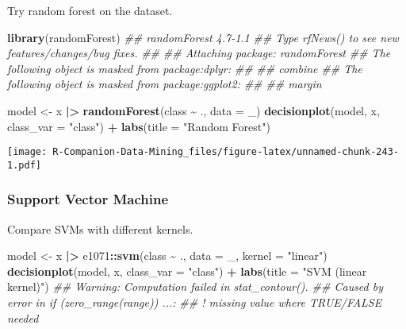 \documentclass[
  notitlepage]{book}
\newenvironment{Shaded}{\begin{snugshade}}{\end{snugshade}}
\newcommand{\CommentTok}[1]{\textcolor[rgb]{0.56,0.35,0.01}{\textit{#1}}}
\newcommand{\DataTypeTok}[1]{\textcolor[rgb]{0.13,0.29,0.53}{#1}}
\newcommand{\ErrorTok}[1]{\textcolor[rgb]{0.64,0.00,0.00}{\textbf{#1}}}
\newcommand{\KeywordTok}[1]{\textcolor[rgb]{0.13,0.29,0.53}{\textbf{#1}}}
\newcommand{\NormalTok}[1]{#1}
\newcommand{\OperatorTok}[1]{\textcolor[rgb]{0.81,0.36,0.00}{\textbf{#1}}}
\newcommand{\StringTok}[1]{\textcolor[rgb]{0.31,0.60,0.02}{#1}}
\begin{document}
Try random forest on the dataset.

\begin{Shaded}
\begin{Highlighting}[]
\KeywordTok{library}\NormalTok{(randomForest)}
\CommentTok{\#\# randomForest 4.7{-}1.1}
\CommentTok{\#\# Type rfNews() to see new features/changes/bug fixes.}
\CommentTok{\#\# }
\CommentTok{\#\# Attaching package: \textquotesingle{}randomForest\textquotesingle{}}
\CommentTok{\#\# The following object is masked from \textquotesingle{}package:dplyr\textquotesingle{}:}
\CommentTok{\#\# }
\CommentTok{\#\#     combine}
\CommentTok{\#\# The following object is masked from \textquotesingle{}package:ggplot2\textquotesingle{}:}
\CommentTok{\#\# }
\CommentTok{\#\#     margin}
\end{Highlighting}
\end{Shaded}

\begin{Shaded}
\begin{Highlighting}[]
\NormalTok{model \textless{}{-}}\StringTok{ }\NormalTok{x }\OperatorTok{|}\ErrorTok{\textgreater{}}\StringTok{ }\KeywordTok{randomForest}\NormalTok{(class }\OperatorTok{\textasciitilde{}}\StringTok{ }\NormalTok{., }\DataTypeTok{data =}\NormalTok{ \_)}
\KeywordTok{decisionplot}\NormalTok{(model, x, }\DataTypeTok{class\_var =} \StringTok{"class"}\NormalTok{) }\OperatorTok{+}\StringTok{ }
\StringTok{  }\KeywordTok{labs}\NormalTok{(}\DataTypeTok{title =} \StringTok{"Random Forest"}\NormalTok{)}
\end{Highlighting}
\end{Shaded}

\texttt{[image: R-Companion-Data-Mining\_files/figure-latex/unnamed-chunk-243-1.pdf]}

\hypertarget{support-vector-machine-1}{%
\subsubsection{Support Vector Machine}\label{support-vector-machine-1}}

Compare SVMs with different kernels.

\begin{Shaded}
\begin{Highlighting}[]
\NormalTok{model \textless{}{-}}\StringTok{ }\NormalTok{x }\OperatorTok{|}\ErrorTok{\textgreater{}}\StringTok{ }\NormalTok{e1071}\OperatorTok{::}\KeywordTok{svm}\NormalTok{(class }\OperatorTok{\textasciitilde{}}\StringTok{ }\NormalTok{., }\DataTypeTok{data =}\NormalTok{ \_, }
                         \DataTypeTok{kernel =} \StringTok{"linear"}\NormalTok{)}
\KeywordTok{decisionplot}\NormalTok{(model, x, }\DataTypeTok{class\_var =} \StringTok{"class"}\NormalTok{) }\OperatorTok{+}\StringTok{ }
\StringTok{  }\KeywordTok{labs}\NormalTok{(}\DataTypeTok{title =} \StringTok{"SVM (linear kernel)"}\NormalTok{)}
\CommentTok{\#\# Warning: Computation failed in \textasciigrave{}stat\_contour()\textasciigrave{}.}
\CommentTok{\#\# Caused by error in \textasciigrave{}if (zero\_range(range)) ...\textasciigrave{}:}
\CommentTok{\#\# ! missing value where TRUE/FALSE needed}
\end{Highlighting}
\end{Shaded}
\end{document}
